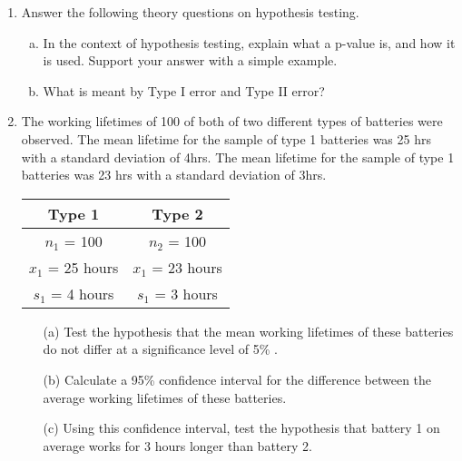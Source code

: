 \documentclass[a4paper,12pt]{article}
\begin{document}
\begin{enumerate}
\item Answer the following theory questions on hypothesis testing.
\begin{enumerate}[(a)]
\item In the context of hypothesis testing, explain what a p-value is, and how it is used. Support your answer with a simple example.
\item What is meant by Type I error and Type II error?
\end{enumerate}



\item The working lifetimes of 100 of both of two different types of batteries were observed. The mean lifetime for the sample of type 1 batteries was 25 hrs with a standard deviation of 4hrs. The mean lifetime for the sample of type 1 batteries was 23 hrs with a standard deviation of 3hrs. 
\begin{center}
\begin{tabular}{|c||c|}
\hline 
Type 1 & Type 2 \\ \hline \hline
$n_1$ = 100 & $n_2$ = 100 \\ \hline
$x_1$ = 25 hours & $x_1$ = 23 hours \\ \hline
$s_1$ = 4 hours & $s_1$ = 3 hours \\ \hline
\end{tabular} 
\end{center}
\begin{itemize}
\item[(a)] Test the hypothesis that the mean working lifetimes of these batteries do not differ at a significance level of 5\% .

\item[(b)] Calculate a 95\% confidence interval for the difference between the average working lifetimes of these batteries. 
\item[(c)] Using this confidence interval, test the hypothesis that battery 1 on average works for 3 hours longer than battery 2.
\end{itemize}


\end{enumerate}



\end{document}
